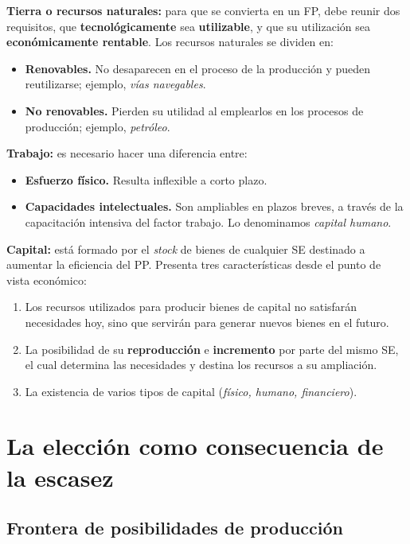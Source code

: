 \documentclass[10pt,a4paper]{article}
\begin{document}
\begin{description}
\item \textbf{Tierra o recursos naturales:} para que se convierta en un FP, debe reunir dos requisitos, que \textbf{tecnológicamente} sea \textbf{utilizable}, y que su utilización sea \textbf{económicamente rentable}. Los recursos naturales se dividen en:
\begin{itemize}
\item \textbf{Renovables.} No desaparecen en el proceso de la producción y pueden reutilizarse; ejemplo, \textit{vías navegables}.
\item \textbf{No renovables.} Pierden su utilidad al emplearlos en los procesos de producción; ejemplo, \textit{petróleo}.
\end{itemize}
\item \textbf{Trabajo:} es necesario hacer una diferencia entre:
\begin{itemize}
\item \textbf{Esfuerzo físico.} Resulta inflexible a corto plazo.
\item \textbf{Capacidades intelectuales.} Son ampliables en plazos breves, a través de la capacitación intensiva del factor trabajo. Lo denominamos \textit{capital humano}.
\end{itemize}
\item \textbf{Capital:} está formado por el \textit{stock} de bienes de cualquier SE destinado a aumentar la eficiencia del PP. Presenta tres características desde el punto de vista económico:
\begin{enumerate}
\item Los recursos utilizados para producir bienes de capital no satisfarán necesidades hoy, sino que servirán para generar nuevos bienes en el futuro.
\item La posibilidad de su \textbf{reproducción} e \textbf{incremento} por parte del mismo SE, el cual determina las necesidades y destina los recursos a su ampliación.
\item La existencia de varios tipos de capital (\textit{físico, humano, financiero}).
\end{enumerate}
\end{description}

\section{La elección como consecuencia de la escasez}

\subsection{Frontera de posibilidades de producción}
\end{document}
